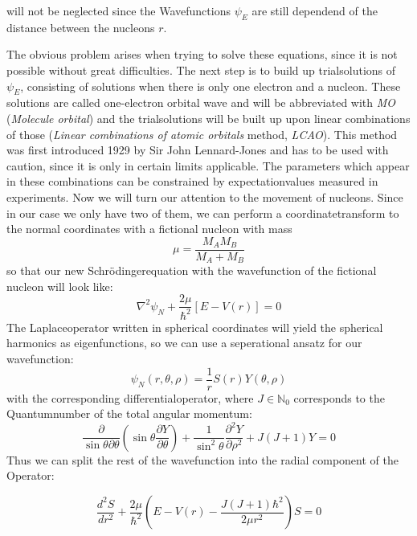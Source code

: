 will not be neglected since the Wavefunctions $\psi_E$ are still
dependend of the distance between the nucleons $r$. 
\par
The obvious problem arises when trying to solve these equations,
since it is not possible without great difficulties. 
The next step is to build up trialsolutions of $\psi_E$, 
consisting of solutions when there is only one electron and a
nucleon. These solutions are called one-electron orbital wave
and will be abbreviated
with \textit{MO} (\textit{Molecule orbital}) and the trialsolutions
will be built up upon linear combinations of those
(\textit{Linear combinations of atomic orbitals} method,
\textit{LCAO}). This method was first introduced 1929 by 
Sir John Lennard-Jones and has to be used with caution, since
it is only in certain limits applicable. The parameters which
appear in these combinations can be constrained by 
expectationvalues measured in experiments.
Now we will turn our attention to the movement of nucleons.
Since in our case we only have two of them, we can perform 
a coordinatetransform to the normal coordinates with a fictional
nucleon with mass
\begin{equation}
    \mu = \frac{M_A M_B}{M_A + M_B}
\end{equation}
so that our new Schrödingerequation with the wavefunction of the
fictional nucleon will look like:
\begin{equation}
    \nabla^2 \psi_N + \frac{2\mu}{\hbar^2} 
    \left[ E - V(r) \right] = 0 
\end{equation}
The Laplaceoperator written in spherical coordinates will yield
the spherical harmonics as eigenfunctions, so we can use a 
seperational ansatz for our wavefunction:
\begin{equation}
    \psi_N(r,\theta,\rho) = \frac{1}{r} S(r)Y(\theta,\rho)
\end{equation}
with the corresponding
differentialoperator, where $J\in \mathbb{N}_0$
corresponds to the Quantumnumber of the total angular momentum:
\begin{equation}
    \frac{\partial}{\sin\theta \partial \theta}\left (\sin\theta
    \frac{\partial Y}{\partial \theta}\right ) +
\frac{1}{\sin^2\theta} \frac{\partial^2 Y}{ \partial\rho^2}
 + J(J+1)Y = 0
\end{equation}
Thus we can split the rest of the wavefunction into the 
radial component of the Operator:

\begin{equation}
    \frac{d^2 S}{dr^2} + \frac{2\mu}{\hbar^2}
\left ( E - V(r) - \frac{J(J+1)\hbar^2}{2\mu r^2} \right ) S =0 
\end{equation}

